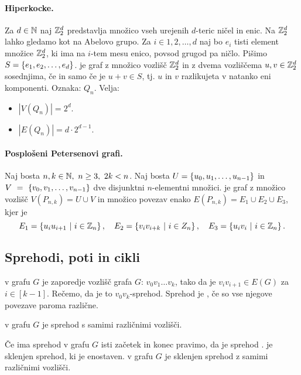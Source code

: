 \paragraph{Hiperkocke.} Za $d \in \mathbb{N}$ naj $\mathbb{Z}_2^d$ predstavlja množico vseh urejenih $d$-teric ničel in enic. Na $\mathbb{Z}_2^d$ lahko gledamo kot na Abelovo grupo. Za $i \in {1, 2, \ldots, d}$ naj bo $e_i$ tisti element množice $\mathbb{Z}_2^d$, ki ima na $i$-tem mesu enico, povsod grugod pa ničlo. Pišimo $S = \left\{e_1, e_2, \ldots, e_d\right\}$.  je graf z množico vozlišč $\mathbb{Z}_2^d$ in z dvema vozliščema $u, v \in \mathbb{Z}_2^d$ sosednjima, če in samo če je $u+ v \in S$, tj. $u$ in $v$ razlikujeta v natanko eni komponenti. Oznaka: $Q_n$. Velja:
\begin{itemize}
    \item $|V(Q_n)| = 2^d$.
    \item $|E(Q_n)| = d \cdot 2 ^{d-1}$.
\end{itemize}

\paragraph{Posplošeni Petersenovi grafi.} Naj bosta $n, k \in \mathbb{N}, \ n \geq 3, \ 2k < n$. Naj bosta $U = \left\{u_0, u_1, \ldots, u_{n-1}\right\}$ in $V~=~\left\{v_0, v_1, \ldots, v_{n-1}\right\}$ dve disjunktni $n$-elementni množici.  je graf z množico vozlišč $V(P_{n,k}) = U \cup V$ in množico povezav enako $E(P_{n,k}) = E_1 \cup E_2 \cup E_3$, kjer je 
$$E_1 = \left\{u_iu_{i+1} \ | \ i \in \mathbb{Z}_n\right\}, \quad E_2 = \left\{v_iv_{i+k} \ | \ i \in Z_n\right\}, \quad E_3 = \left\{u_iv_i \ | \ i \in \mathbb{Z}_n\right\}.$$

\subsection{Sprehodi, poti in cikli}
\begin{definicija}
     v grafu $G$ je zaporedje vozlišč grafa $G$: $v_0v_1\ldots v_k$, tako da je $v_iv_{i+1} \in E(G)$ za $i \in [k-1]$. Rečemo, da je to $v_0v_k$-sprehod. Sprehod je , če so vse njegove povezave paroma različne.
\end{definicija}

\begin{definicija}
     v grafu $G$ je sprehod s samimi različnimi vozlišči.
\end{definicija}

\begin{definicija}
    Če ima sprehod v grafu $G$ isti začetek in konec pravimo, da je sprehod .  je sklenjen sprehod, ki je enostaven.  v grafu $G$ je sklenjen sprehod z samimi različnimi vozlišči.
\end{definicija}

